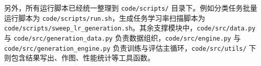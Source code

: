 \documentclass[a4paper]{article}
\begin{document}
另外，所有运行脚本已经统一整理到 \texttt{code/scripts/} 目录下。例如分类任务批量运行脚本为 \texttt{code/scripts/run.sh}，生成任务学习率扫描脚本为 \texttt{code/scripts/sweep\_lr\_generation.sh}。其余支撑模块中，\texttt{code/src/data.py} 与 \texttt{code/src/generation\_data.py} 负责数据组织，\texttt{code/src/engine.py} 与 \texttt{code/src/generation\_engine.py} 负责训练与评估主循环，\texttt{code/src/utils/} 下则包含结果写出、作图、性能统计等工具函数。



\end{document}
